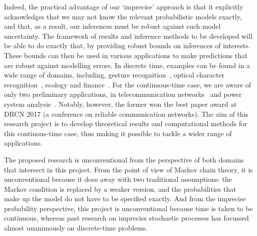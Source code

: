 \documentclass[11pt,dvipsnames,usenames,a4paper]{article}
\begin{document}
Indeed, the practical advantage of our `imprecise' approach is that it explicitly acknowledges that we may not know the relevant probabilistic models exactly, and that, as a result, our inferences must be robust against such model uncertainty. 
The framework of results and inference methods to be developed will be able to do exactly that, by providing robust bounds on inferences of interests. These bounds can then be used in various applications to make predictions that are robust against modelling errors. In discrete time, examples can be found in a wide range of domains, including, gesture recognition~\cite{soullard2017:gesturerecognition}, optical character recognition~\cite{debock2014:estihmm}, ecology \cite{samuels2009phd} and finance~\cite{niemiec2007:bonusmalus}. For the continuous-time case, we are aware of only two preliminary applications, in telecommunication networks~\cite{rottondi2017:flexigrid} and power system analysis~\cite{Troffaes+GSB-ISIPTA15p}. Notably, however, the former won the best paper award at DRCN 2017 (a conference on reliable communication networks). The aim of this research project is to develop theoretical results and computational methods for this continous-time case, thus making it possible to tackle a wider range of applications.




The proposed research is unconventional from the perspective of both domains that intersect in this project.
From the point of view of Markov chain theory, it is unconventional because it does away with two traditional assumptions: the Markov condition is replaced by a weaker version, and the probabilities that make up the model do not have to be specified exactly. 
And from the imprecise probability perspective, this project is unconventional because time is taken to be continuous, whereas past research on imprecise stochastic processes has focussed almost unanimously on discrete-time problems.
\end{document}
